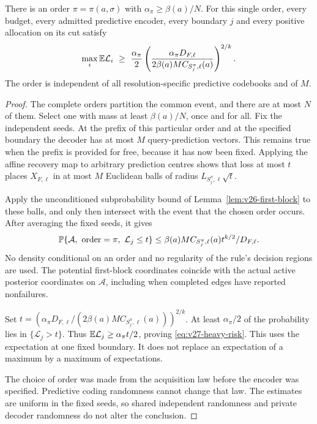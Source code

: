\begin{lemma}\label{lem:v27-heavy}
There is an order $\pi=\pi(a,\sigma)$ with $\alpha_\pi\ge\beta(a)/N$. For this single order, every budget, every admitted predictive encoder, every boundary $j$ and every positive allocation on its cut satisfy
\begin{equation}\label{eq:v27-heavy-risk}
 \max_i\mathbb E\mathcal L_i\ \ge\
 \frac{\alpha_\pi}{2}
 \left(\frac{\alpha_\pi D_{F,\ell}}
 {2\beta(a)M C_{S_j^\pi,\ell}(a)}\right)^{2/k}.
\end{equation}
The order is independent of all resolution-specific predictive codebooks and of $M$.
\end{lemma}
\begin{proof}
The complete orders partition the common event, and there are at most $N$ of them. Select one with mass at least $\beta(a)/N$, once and for all. Fix the independent seeds. At the prefix of this particular order and at the specified boundary the decoder has at most $M$ query-prediction vectors. This remains true when the prefix is provided for free, because it has now been fixed. Applying the affine recovery map to arbitrary prediction centres shows that loss at most $t$ places $X_{F,\ell}$ in at most $M$ Euclidean balls of radius $L_{S_j^\pi,\ell}\sqrt t$.

Apply the unconditioned subprobability bound of Lemma~\ref{lem:v26-first-block} to these balls, and only then intersect with the event that the chosen order occurs. After averaging the fixed seeds, it gives
\begin{equation}\label{eq:v27-trace-smallball}
 \mathbb P\{\mathcal A,\ \mathrm{order}=\pi,\ \mathcal L_j\le t\}
 \le \beta(a)M C_{S_j^\pi,\ell}(a)t^{k/2}/D_{F,\ell}.
\end{equation}
No density conditional on an order and no regularity of the rule's decision regions are used. The potential first-block coordinates coincide with the actual active posterior coordinates on $\mathcal A$, including when completed edges have reported nonfailures.

Set $t=(\alpha_\pi D_{F,\ell}/(2\beta(a)M C_{S_j^\pi,\ell}(a)))^{2/k}$. At least $\alpha_\pi/2$ of the probability lies in $\{\mathcal L_j>t\}$. Thus $\mathbb E\mathcal L_j\ge\alpha_\pi t/2$, proving \eqref{eq:v27-heavy-risk}. This uses the expectation at one fixed boundary. It does not replace an expectation of a maximum by a maximum of expectations.

The choice of order was made from the acquisition law before the encoder was specified. Predictive coding randomness cannot change that law. The estimates are uniform in the fixed seeds, so shared independent randomness and private decoder randomness do not alter the conclusion.
\end{proof}

